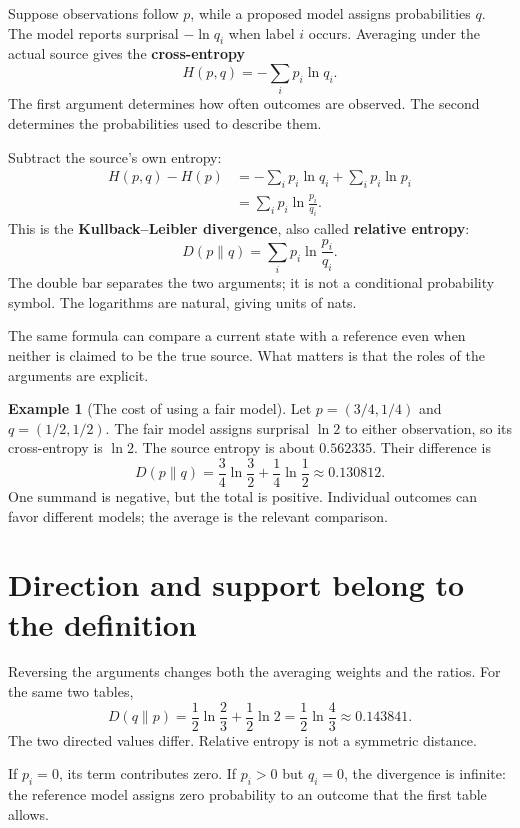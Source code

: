\documentclass[11pt,oneside,openany]{book}
\theoremstyle{definition}
\newtheorem{example}{Example}[chapter]
\theoremstyle{remark}
\numberwithin{equation}{chapter}
\begin{document}
Suppose observations follow \(p\), while a proposed model assigns probabilities \(q\). The model reports surprisal \(-\ln q_i\) when label \(i\) occurs. Averaging under the actual source gives the \textbf{cross-entropy} \[H(p,q)=-\sum_i p_i\ln q_i.\] The first argument determines how often outcomes are observed. The second determines the probabilities used to describe them.

Subtract the source's own entropy: \[\begin{aligned}
H(p,q)-H(p)
&=-\sum_i p_i\ln q_i+\sum_i p_i\ln p_i\\
&=\sum_i p_i\ln\frac{p_i}{q_i}.
\end{aligned}\] This is the \textbf{Kullback--Leibler divergence}, also called \textbf{relative entropy}: \[\boxed{D(p\|q)=\sum_i p_i\ln\frac{p_i}{q_i}.}\] The double bar separates the two arguments; it is not a conditional probability symbol. The logarithms are natural, giving units of nats.

The same formula can compare a current state with a reference even when neither is claimed to be the true source. What matters is that the roles of the arguments are explicit.

\begin{example}[The cost of using a fair model]

Let \(p=(3/4,1/4)\) and \(q=(1/2,1/2)\). The fair model assigns surprisal \(\ln2\) to either observation, so its cross-entropy is \(\ln2\). The source entropy is about \(0.562335\). Their difference is \[D(p\|q)=\frac34\ln\frac32+\frac14\ln\frac12
\approx0.130812.\] One summand is negative, but the total is positive. Individual outcomes can favor different models; the average is the relevant comparison.

\end{example}

\section{Direction and support belong to the definition}\label{ch06-direction-and-support-belong-to-the-definition}

Reversing the arguments changes both the averaging weights and the ratios. For the same two tables, \[D(q\|p)=\frac12\ln\frac23+\frac12\ln2
=\frac12\ln\frac43\approx0.143841.\] The two directed values differ. Relative entropy is not a symmetric distance.

If \(p_i=0\), its term contributes zero. If \(p_i>0\) but \(q_i=0\), the divergence is infinite: the reference model assigns zero probability to an outcome that the first table allows.
\end{document}
